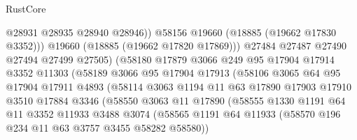 \begin{lexlean}{RustCore}
\begin{coremodule}
                                    @28931
                                    @28935
                                    @28940
                                    @28946))
                                @58156
                                @19660
                                (@18885 (@19662 @17830 @3352)))
                              @19660
                              (@18885 (@19662 @17820 @17869)))
                            @27484
                            @27487
                            @27490
                            @27494
                            @27499
                            @27505)
                          (@58180
                            @17879
                            @3066
                            @249
                            @95
                            @17904
                            @17914
                            @3352
                            @11303
                            (@58189
                              @3066
                              @95
                              @17904
                              @17913
                              (@58106
                                @3065
                                @64
                                @95
                                @17904
                                @17911
                                @4893
                                (@58114
                                  @3063
                                  @1194
                                  @11
                                  @63
                                  @17890
                                  @17903
                                  @17910
                                  @3510
                                  @17884
                                  @3346
                                  (@58550
                                    @3063
                                    @11
                                    @17890
                                    (@58555
                                      @1330
                                      @1191
                                      @64
                                      @11
                                      @3352
                                      @11933
                                      @3488
                                      @3074
                                      (@58565
                                        @1191
                                        @64
                                        @11933
                                        (@58570 @196 @234 @11 @63 @3757 @3455 @58282 @58580))

\end{coremodule}
\end{lexlean}
